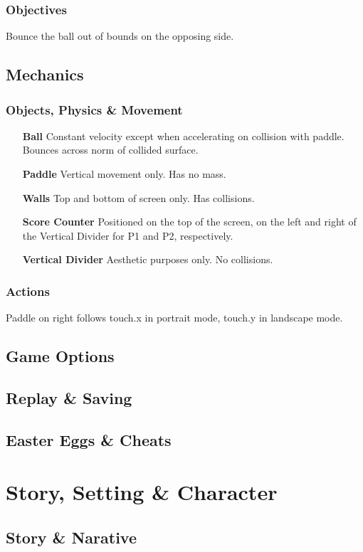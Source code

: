 \documentclass[12pt, letterpaper]{article}
\begin{document}
        \subsubsection{Objectives}
        Bounce the ball out of bounds on the opposing side.
    \subsection{Mechanics}
        \subsubsection{Objects, Physics \& Movement}
        \begin{itemize}
            \item[\textbf{Ball}] Constant velocity except when accelerating on collision with paddle. Bounces across norm of collided surface.
            \item[\textbf{Paddle}] Vertical movement only. Has no mass.
            \item[\textbf{Walls}] Top and bottom of screen only. Has collisions.
            \item[\textbf{Score Counter}] Positioned on the top of the screen, on the left and right of the Vertical Divider for P1 and P2, respectively.
            \item[\textbf{Vertical Divider}] Aesthetic purposes only. No collisions. 
        \end{itemize}
        \subsubsection{Actions}
            Paddle on right follows touch.x in portrait mode, touch.y in landscape mode.
    \subsection{Game Options}
    \subsection{Replay \& Saving}
    \subsection{Easter Eggs \& Cheats}
\section{Story, Setting \& Character}
    \subsection{Story \& Narative}
\end{document}
